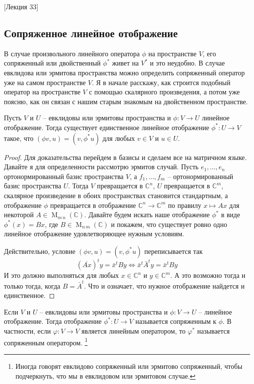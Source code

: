 [Лекция 33]


\subsection{Сопряженное линейное отображение}

В случае произвольного линейного оператора $\phi$ на пространстве $V$, его сопряженный или двойственный $\phi^*$ живет на $V^*$ и это неудобно.
В случае евклидова или эрмитова пространства можно определить сопряженный оператор уже на самом пространстве $V$.
Я в начале расскажу, как строится подобный оператор на пространстве $V$ с помощью скалярного произведения, а потом уже поясню, как он связан с нашим старым знакомым на двойственном пространстве.

\begin{claim}
Пусть $V$ и $U$ -- евклидовы или эрмитовы пространства и $\phi\colon V\to U$ линейное отображение.
Тогда существует единственное линейное отображение $\phi^*\colon U\to V$ такое, что $(\phi v, u) = (v, \phi^* u)$ для любых $v\in V$ и $u\in U$.
\end{claim}
\begin{proof}
Для доказательства перейдем в базисы и сделаем все на матричном языке.
Давайте я для определенности рассмотрю эрмитов случай.
Пусть $e_1,\ldots,e_n$ ортонормированный базис пространства $V$, а $f_1,\ldots,f_m$ -- ортонормированный базис пространства $U$.
Тогда $V$ превращается в $\mathbb C^n$, $U$ превращается в $\mathbb C^m$, скалярное произведение в обоих пространствах становится стандартным, а отображение $\phi$ превращается в отображение $\mathbb C^n \to \mathbb C^m$ по правилу $x \mapsto Ax$ для некоторой $A\in\operatorname{M}_{m\,n}(\mathbb C)$.
Давайте будем искать наше отображение $\phi^*$  в виде $\phi^*(x) = Bx$, где $B\in \operatorname{M}_{n\,m}(\mathbb C)$ и покажем, что существует ровно одно линейное отображение удовлетворяющее нужным условиям.

Действительно, условие $(\phi v, u) = (v, \phi^* u)$ переписывается так
\[
(\overline{Ax})^t y = \bar x^t By\iff \bar x^t \bar A^t y = \bar x^t B y
\]
И это должно выполняться для любых $x\in \mathbb C^n$ и $y\in \mathbb C^m$.
А это возможно тогда и только тогда, когда $B = \bar A^t$.
Что и означает, что нужное отображение найдется и единственное.
\end{proof}

\begin{definition}
Если $V$ и $U$ -- евклидовы или эрмитовы пространства и $\phi\colon V\to U$ -- линейное отображение.
Тогда отображение $\phi^*\colon U\to V$ называется сопряженным к $\phi$.
В частности, если $\varphi\colon V\to V$ является линейным оператором, то $\varphi^*$ называется сопряженным оператором.%
\footnote{Иногда говорят евклидово сопряженный или эрмитово сопряженный, чтобы подчеркнуть, что мы в евклидовом или эрмитовом случае.}
\end{definition}

